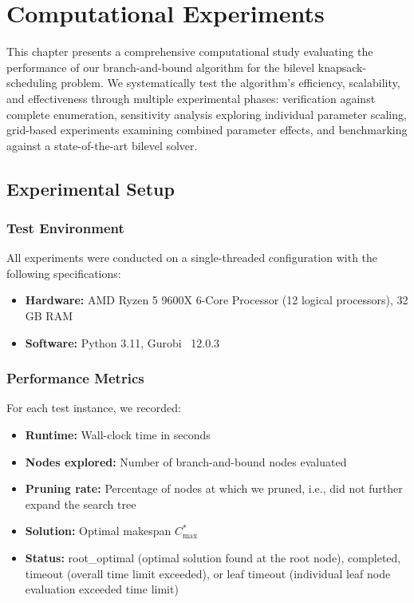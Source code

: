 \chapter{Computational Experiments}
\label{sec:experiments}

This chapter presents a comprehensive computational study evaluating the performance of our branch-and-bound algorithm for the bilevel knapsack-scheduling problem. We systematically test the algorithm's efficiency, scalability, and effectiveness through multiple experimental phases: verification against complete enumeration, sensitivity analysis exploring individual parameter scaling, grid-based experiments examining combined parameter effects, and benchmarking against a state-of-the-art bilevel solver.

\section{Experimental Setup}

\subsection{Test Environment}
All experiments were conducted on a single-threaded configuration with the following specifications:
\begin{itemize}
    \item \textbf{Hardware:} AMD Ryzen 5 9600X 6-Core Processor (12 logical processors), 32 GB RAM
    \item \textbf{Software:} Python 3.11, Gurobi~\cite{gurobi} 12.0.3
\end{itemize}

\subsection{Performance Metrics}

For each test instance, we recorded:
\begin{itemize}
    \item \textbf{Runtime:} Wall-clock time in seconds
    \item \textbf{Nodes explored:} Number of branch-and-bound nodes evaluated
    \item \textbf{Pruning rate:} Percentage of nodes at which we pruned, i.e., did not further expand the search tree
    \item \textbf{Solution:} Optimal makespan $C_{\max}^*$
    \item \textbf{Status:} root\_optimal (optimal solution found at the root node), completed, timeout (overall time limit exceeded), or leaf timeout (individual leaf node evaluation exceeded time limit)
\end{itemize}

